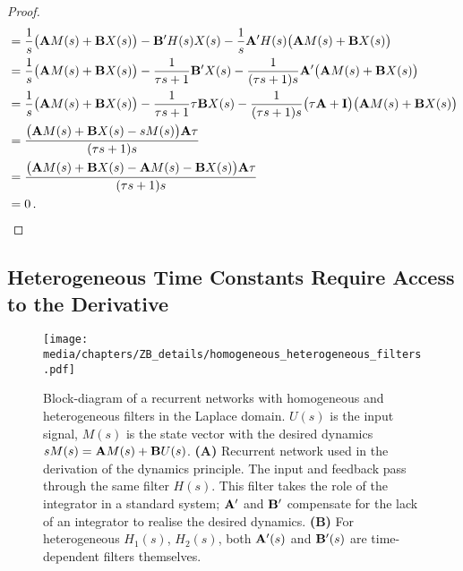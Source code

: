 \begin{proof}
\begin{align*}
	&= \frac{1}{s} \bigl( \mathbf{A} M(s) + \mathbf{B} X(s) \bigr)
	 - \mathbf{B}' H(s) X(s)
	 - \frac{1}{s} \mathbf{A}' H(s) \bigl(\mathbf{A} M(s) + \mathbf{B} X(s)\bigr) \\
	&= \frac{1}{s} \bigl( \mathbf{A} M(s) + \mathbf{B} X(s) \bigr)
	 - \frac{1}{\tau s + 1} \mathbf{B}' X(s)
	 - \frac{1}{(\tau s + 1) s} \mathbf{A}' \bigl( \mathbf{A} M(s) + \mathbf{B} X(s) \bigr) \\
	&= \frac{1}{s} \bigl( \mathbf{A} M(s) + \mathbf{B} X(s) \bigr)
	 - \frac{1}{\tau s + 1} \tau \mathbf{B} X(s)
	 - \frac{1}{(\tau s + 1) s} \bigl(\tau \mathbf{A} + \mathbf{I} \bigr) \bigl(\mathbf{A} M(s) + \mathbf{B} X(s)\bigr) \\
	&= \frac{\bigl(\mathbf{A} M(s) + \mathbf{B} X(s) - s M(s)\bigr) \mathbf{A} \tau}{(\tau s + 1) s} \\
	&= \frac{\bigl(\mathbf{A} M(s) + \mathbf{B} X(s) - \mathbf{A} M(s) - \mathbf{B} X(s)\bigr) \mathbf{A} \tau}{(\tau s + 1) s} \\
	&= 0 \,. \qedhere
\end{align*}
\end{proof}

\subsection{Heterogeneous Time Constants Require Access to the Derivative}
\label{app:heterogenous_time_constants}

\begin{figure}
	\texttt{[image: media/chapters/ZB\_details/homogeneous\_heterogeneous\_filters.pdf]}%
	{\label{fig:homogeneous_heterogeneous_filters_a}}%
	{\label{fig:homogeneous_heterogeneous_filters_b}}%
	\caption[Block-diagram of a recurrent networks with homogeneous and heterogeneous filters]{Block-diagram of a recurrent networks with homogeneous and heterogeneous filters in the Laplace domain. $U(s)$ is the input signal, $M(s)$ is the state vector with the desired \LTI dynamics $s M(s) = \mathbf{A} M(s) + \mathbf{B} U(s)$.
	\textbf{(A)} Recurrent network used in the derivation of the \NEF dynamics principle. The input and feedback pass through the same filter $H(s)$.
	This filter takes the role of the integrator in a standard \LTI system; $\mathbf{A}'$ and $\mathbf{B}'$ compensate for the lack of an integrator to realise the desired dynamics.
	\textbf{(B)} For heterogeneous $H_1(s)$, $H_2(s)$, both $\mathbf{A}'(s)$ and $\mathbf{B}'(s)$ are time-dependent filters themselves.
	}
	\label{fig:homogeneous_heterogeneous_filters}
\end{figure}

